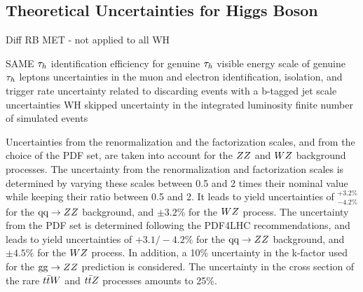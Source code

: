 \subsection{Theoretical Uncertainties for Higgs Boson}

Diff RB
MET - not applied to all WH

SAME
$\tau_{h}$ identification efficiency for genuine $\tau_{h}$
visible energy scale of genuine $\tau_{h}$ leptons
uncertainties in the muon and electron identification, isolation, and trigger
rate uncertainty related to discarding events with a b-tagged jet
\etvecmiss scale uncertainties
    WH skipped
uncertainty in the integrated luminosity
finite number of simulated events



%
%
%



Uncertainties from the renormalization and the factorization scales, and from the 
choice of the PDF set, are taken into account for the $ZZ$ and $WZ$ 
background processes. The uncertainty from the renormalization and factorization 
scales is determined by varying these scales between 0.5 and 2 times their nominal 
value while keeping their ratio between 0.5 and 2. It leads to yield uncertainties 
of $^{+3.2\%}_{-4.2\%}$ for the $\text{q}\text{q}\rightarrow ZZ$ background, and $\pm 3.2\%$ 
for the $WZ$ process. The uncertainty from the PDF set is determined following 
the PDF4LHC recommendations, and leads to yield uncertainties of $+3.1/-4.2\%$ for 
the $\text{q}\text{q}\rightarrow ZZ$ background, and $\pm 4.5\%$ for the $WZ$ process. 
In addition, a 10\% uncertainty in the k-factor used for the $\text{g}\text{g} \rightarrow 
ZZ$  prediction is considered.  The uncertainty in the cross section of the 
rare $t\bar{t}W$ and $t\bar{t}Z$ processes amounts to 25\%.

